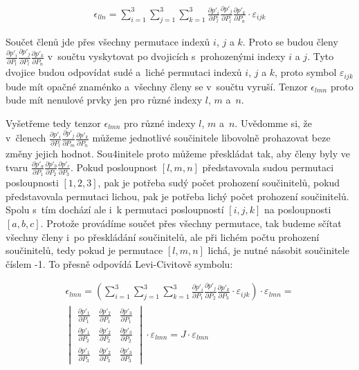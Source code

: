 \begin{equation}
\begin{split}
\epsilon_{lln} = \sum_{i=1}^3 \sum_{j=1}^3 \sum_{k=1}^3 \frac{\partial p'_i}{\partial P_l} \frac{\partial p'_j}{\partial P_l} \frac{\partial p'_k}{\partial P_n} \cdot \varepsilon_{ijk}
\end{split}
\end{equation}

Součet členů jde přes všechny permutace indexů \(i\), \(j\) a \(k\). Proto se budou členy \(\frac{\partial p'_i}{\partial P_l} \frac{\partial p'_j}{\partial P_l} \frac{\partial p'_k}{\partial P_n}\) v~součtu vyskytovat po dvojicích s~prohozenými indexy \(i\) a \(j\). Tyto dvojice budou odpovídat sudé a~liché permutaci indexů \(i\), \(j\) a \(k\), proto symbol \(\varepsilon_{ijk}\) bude mít opačné znaménko a~všechny členy se v~součtu vyruší. Tenzor \(\epsilon_{lmn}\) proto bude mít nenulové prvky jen pro různé indexy \(l\), \(m\) a~\(n\).

Vyšetřeme tedy tenzor \(\epsilon_{lmn}\) pro různé indexy \(l\), \(m\) a~\(n\). Uvědomme si, že v~členech \(\frac{\partial p'_i}{\partial P_l} \frac{\partial p'_j}{\partial P_m} \frac{\partial p'_k}{\partial P_n}\) můžeme jednotlivé součinitele libovolně prohazovat beze změny jejich hodnot. Sou4initele proto můžeme přeskládat tak, aby členy byly ve tvaru \(\frac{\partial p'_a}{\partial P_1} \frac{\partial p'_b}{\partial P_2} \frac{\partial p'_c}{\partial P_3}\). Pokud posloupnost \([l, m, n]\) představovala sudou permutaci posloupnosti \([1, 2, 3]\), pak je potřeba sudý počet prohození součinitelů, pokud představovala permutaci lichou, pak je potřeba lichý počet prohození součinitelů. Spolu s~tím dochází ale i~k permutaci posloupností \([i, j, k]\) na posloupnosti \([a, b, c]\). Protože provádíme součet přes všechny permutace, tak budeme sčítat všechny členy i~po přeskládání součinitelů, ale při lichém počtu prohození součinitelů, tedy pokud je permutace \([l, m, n]\) lichá, je nutné násobit součinitele číslem -1. To přesně odpovídá Levi-Civitově symbolu:

\begin{equation}
\begin{split}
\epsilon_{lmn} = \left(\sum_{i=1}^3 \sum_{j=1}^3 \sum_{k=1}^3 \frac{\partial p'_i}{\partial P_1} \frac{\partial p'_j}{\partial P_2} \frac{\partial p'_k}{\partial P_3} \cdot \varepsilon_{ijk} \right) \cdot \varepsilon_{lmn} = \\
\begin{vmatrix}
  \frac{\partial p'_1}{\partial P_1} & \frac{\partial p'_2}{\partial P_1} & \frac{\partial p'_3}{\partial P_1} \\
  \frac{\partial p'_1}{\partial P_2} & \frac{\partial p'_2}{\partial P_2} & \frac{\partial p'_3}{\partial P_2} \\
  \frac{\partial p'_1}{\partial P_3} & \frac{\partial p'_2}{\partial P_3} & \frac{\partial p'_3}{\partial P_3}
\end{vmatrix}
\cdot \varepsilon_{lmn} = J \cdot \varepsilon_{lmn}
\end{split}
\end{equation}

